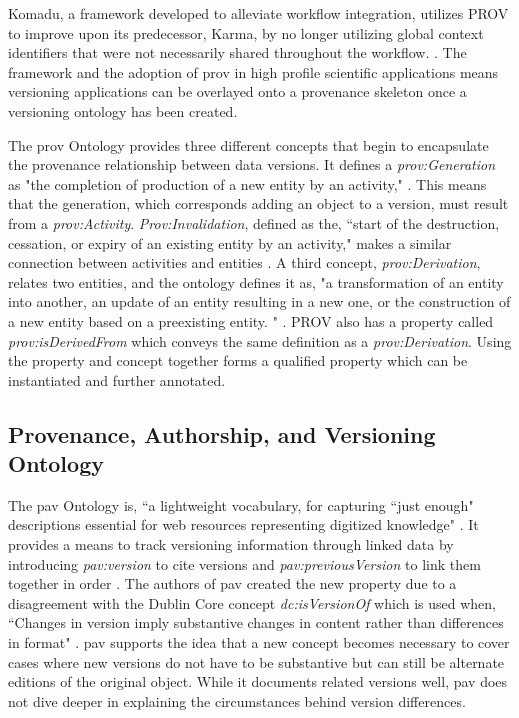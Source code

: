 Komadu, a framework developed to alleviate workflow integration, utilizes PROV to improve upon its predecessor, Karma, by no longer utilizing global context identifiers that were not necessarily shared throughout the workflow. \cite{Suriarachchi_2015}.
The framework and the adoption of \gls{prov} in high profile scientific applications means versioning applications can be overlayed onto a \gls{provenance} skeleton once a versioning ontology has been created.

The \gls{prov} Ontology provides three different concepts that begin to encapsulate the provenance relationship between data versions.
It defines a \textit{prov:Generation} as "the completion of production of a new entity by an activity," \cite{Lebo2013}.
This means that the generation, which corresponds adding an object to a version, must result from a \textit{prov:Activity}.
\textit{Prov:Invalidation}, defined as the, ``start of the destruction, cessation, or expiry of an existing entity by an activity," makes a similar connection between activities and entities \cite{Lebo2013}.
A third concept, \textit{prov:Derivation}, relates two entities, and the ontology defines it as, "a transformation of an entity into another, an update of an entity resulting in a new one, or the construction of a new entity based on a preexisting entity. " \cite{Lebo2013}.
PROV also has a property called \textit{prov:isDerivedFrom} which conveys the same definition as a \textit{prov:Derivation}.
Using the property and concept together forms a qualified property which can be instantiated and further annotated.

\subsection{Provenance, Authorship, and Versioning Ontology}

The \gls{pav} Ontology is, ``a lightwei\-ght vocabulary, for capturing ``just enough" descriptions essential for web resources representing digitized knowledge" \cite{Ciccarese2013}.
It provides a means to track versioning information through linked data by introducing \textit{pav:version} to cite versions and \textit{pav:previousVersion} to link them together in order \cite{Ciccarese2013}.
The authors of \gls{pav} created the new property due to a disagreement with the Dublin Core concept \textit{dc:isVersionOf} which is used when, ``Changes in version imply substantive changes in content rather than differences in format" \cite{DCMI2012}.
\gls{pav} supports the idea that a new concept becomes necessary to cover cases where new \glspl{version} do not have to be substantive but can still be alternate editions of the original object.
While it documents related versions well, \gls{pav} does not dive deeper in explaining the circumstances behind version differences.

